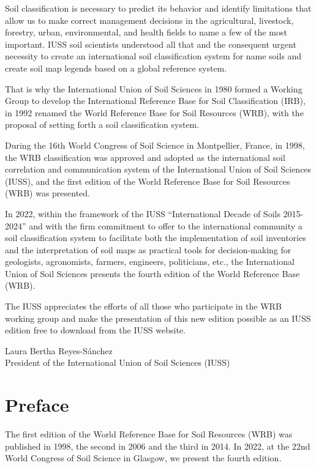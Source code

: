 \documentclass[
  letterpaper,
  DIV=11,
  numbers=noendperiod]{scrreprt}
\begin{document}
Soil classification is necessary to predict its behavior and identify
limitations that allow us to make correct management decisions in the
agricultural, livestock, forestry, urban, environmental, and health
fields to name a few of the most important. IUSS soil scientists
understood all that and the consequent urgent necessity to create an
international soil classification system for name soils and create soil
map legends based on a global reference system.

That is why the International Union of Soil Sciences in 1980 formed a
Working Group to develop the International Reference Base for Soil
Classification (IRB), in 1992 renamed the World Reference Base for Soil
Resources (WRB), with the proposal of setting forth a soil
classification system.

During the 16th World Congress of Soil Science in Montpellier, France,
in 1998, the WRB classification was approved and adopted as the
international soil correlation and communication system of the
International Union of Soil Sciences (IUSS), and the first edition of
the World Reference Base for Soil Resources (WRB) was presented.

In 2022, within the framework of the IUSS ``International Decade of
Soils 2015-2024'' and with the firm commitment to offer to the
international community a soil classification system to facilitate both
the implementation of soil inventories and the interpretation of soil
maps as practical tools for decision-making for geologists, agronomists,
farmers, engineers, politicians, etc., the International Union of Soil
Sciences presents the fourth edition of the World Reference Base (WRB).

The IUSS appreciates the efforts of all those who participate in the WRB
working group and make the presentation of this new edition possible as
an IUSS edition free to download from the IUSS website.

Laura Bertha Reyes-Sánchez\\
President of the International Union of Soil Sciences (IUSS)


\hypertarget{preface}{%
\chapter{Preface}\label{preface}}

The first edition of the World Reference Base for Soil Resources (WRB)
was published in 1998, the second in 2006 and the third in 2014. In
2022, at the 22nd World Congress of Soil Science in Glasgow, we present
the fourth edition.
\end{document}
